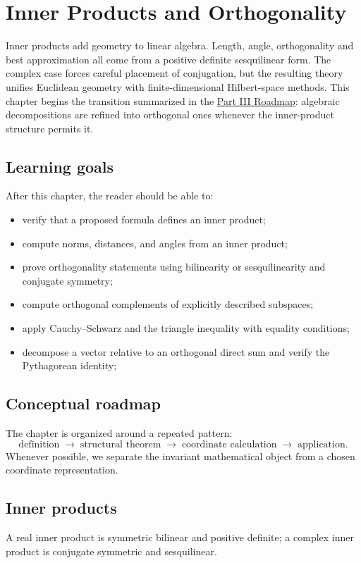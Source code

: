 \chapter{Inner Products and Orthogonality}
\label{ch:i13-inner-products-and-orthogonality}

Inner products add geometry to linear algebra. Length, angle, orthogonality and best approximation all come from a positive definite sesquilinear form. The complex case forces careful placement of conjugation, but the resulting theory unifies Euclidean geometry with finite-dimensional Hilbert-space methods. This chapter begins the transition summarized in the \hyperref[sec:i-part3-roadmap]{Part III Roadmap}: algebraic decompositions are refined into orthogonal ones whenever the inner-product structure permits it.

\section*{Learning goals}
After this chapter, the reader should be able to:
\begin{itemize}
\item verify that a proposed formula defines an inner product;
\item compute norms, distances, and angles from an inner product;
\item prove orthogonality statements using bilinearity or sesquilinearity and conjugate symmetry;
\item compute orthogonal complements of explicitly described subspaces;
\item apply Cauchy--Schwarz and the triangle inequality with equality conditions;
\item decompose a vector relative to an orthogonal direct sum and verify the Pythagorean identity;
\end{itemize}
\section*{Conceptual roadmap}
The chapter is organized around a repeated pattern:
\[
\boxed{\text{definition}\;\longrightarrow\;\text{structural theorem}\;\longrightarrow\;\text{coordinate calculation}\;\longrightarrow\;\text{application}.}
\]
Whenever possible, we separate the invariant mathematical object from a chosen coordinate representation.

\section{Inner products}
A real inner product is symmetric bilinear and positive definite; a complex inner product is conjugate symmetric and sesquilinear.

